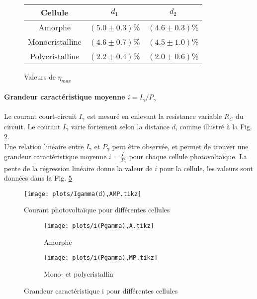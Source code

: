 \begin{figure}[h]
    \centering
    \begin{tabulary}{0.7\linewidth}{C C C}
        \toprule
        Cellule & \(d_1\) & \(d_2\) \\
        \midrule
        Amorphe & \((5.0 \pm 0.3)\)\% & \((4.6 \pm 0.3)\)\% \\
        Monocristalline & \((4.6 \pm 0.7)\)\% & \((4.5 \pm 1.0)\)\% \\
        Polycristalline & \((2.2 \pm 0.4)\)\% & \((2.0 \pm 0.6)\)\% \\
        \bottomrule
    \end{tabulary}
    \caption{Valeurs de \(\eta_{max}\)}
    \label{tab:rendementmax}
\end{figure}


\paragraph*{Grandeur caractéristique moyenne \(i = I_\gamma/P_\gamma\)}
Le courant court-circuit \(I_\gamma\) est mesuré en enlevant la resistance variable \(R_C\) du circuit. Le courant \(I_\gamma\) varie fortement selon la distance \(d\), comme illustré à la Fig. \ref{plot:4}. \\
Une relation linéaire entre \(I_\gamma\) et \(P_\gamma\) peut être observée, et permet de trouver une grandeur caractéristique moyenne \(i = \frac{I_\gamma}{P_\gamma}\) pour chaque cellule photovoltaïque. La pente de la régression linéaire donne la valeur de \(i\) pour la cellule, les valeurs sont données dans la Fig. \ref{plot:5}

\begin{figure}[h]
    \centering
    \texttt{[image: plots/Igamma(d),AMP.tikz]}
    \caption{Courant photovoltaïque pour différentes cellules}
    \label{plot:4}
\end{figure}

\begin{figure}[h]
    \centering
    \begin{subfigure}[t]{0.48\linewidth}
        \centering
        \texttt{[image: plots/i(Pgamma),A.tikz]}
        \caption{Amorphe}
        \label{plot:5a}
    \end{subfigure}
    \begin{subfigure}[t]{0.48\linewidth}
        \centering
        \texttt{[image: plots/i(Pgamma),MP.tikz]}
        \caption{Mono- et polycristallin}
        \label{plot:5b}
    \end{subfigure}
    \caption{Grandeur caractéristique i pour différentes cellules}
    \label{plot:5}
\end{figure}

